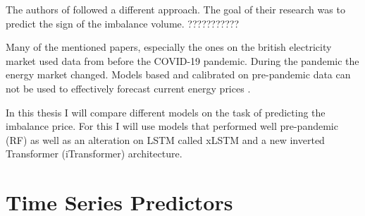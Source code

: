 \documentclass[class=scrbook, crop=false]{standalone}
\begin{document}
The authors of \cite{balazsShorttermSystemImbalance2024} followed a different approach. The goal of their research was to predict the sign of the imbalance volume.  ???????????


Many of the mentioned papers, especially the ones on the british electricity market used data from before the COVID-19 pandemic. During the pandemic the energy market changed. Models based and calibrated on pre-pandemic data can not be used to effectively forecast current energy prices \cite{abadieEnergyMarketPrices2021}.


In this thesis I will compare different models on the task of predicting the imbalance price. For this I will use models that performed well pre-pandemic (RF) as well as an alteration on LSTM called xLSTM and a new inverted Transformer (iTransformer) architecture.


\section{Time Series Predictors}
\label{Section::Time_Series_Predictors}
\end{document}

